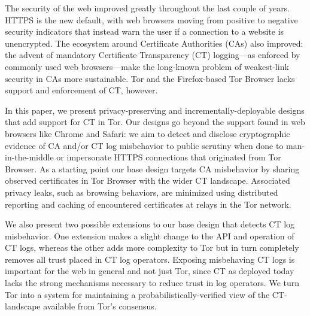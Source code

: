 The security of the web improved greatly throughout the last couple of years.
HTTPS is the new default, with web browsers moving from positive to
negative security indicators that instead warn the user if a connection to a
website is unencrypted.  The ecosystem around Certificate Authorities (CAs) also
improved:
	the advent of mandatory Certificate Transparency (CT) logging---as
	enforced by commonly used web browsers---make the long-known problem of
	weakest-link security in CAs more sustainable.
Tor and the Firefox-based Tor Browser lacks support and enforcement of CT,
however.

\hspace{12pt}
In this paper, we present privacy-preserving and incrementally-deployable
designs that add support for CT in Tor. Our designs go beyond the
support found in web browsers like Chrome and Safari:
	we aim to detect and disclose cryptographic evidence of CA and/or
	CT log misbehavior to public scrutiny when done to man-in-the-middle or
	impersonate HTTPS connections that originated from Tor Browser.
As a starting point our base design targets CA misbehavior by sharing observed
certificates in Tor Browser with the wider CT landscape.  Associated privacy
leaks, such as browsing behaviors, are minimized using distributed reporting and
caching of encountered certificates at relays in the Tor network.


\hspace{12pt}
We also present two possible extensions to our base design that detects CT log
misbehavior. One extension makes a slight change to the API and operation
of CT logs, whereas the other adds more complexity to Tor but in turn completely
removes all trust placed in CT log operators.  Exposing misbehaving CT logs
is important for the web in general and not just Tor, since CT as deployed today
lacks the strong mechanisms necessary to reduce trust in log operators.  We turn
Tor into a system for maintaining a probabilistically-verified view of the 
CT-landscape available from Tor’s consensus.
